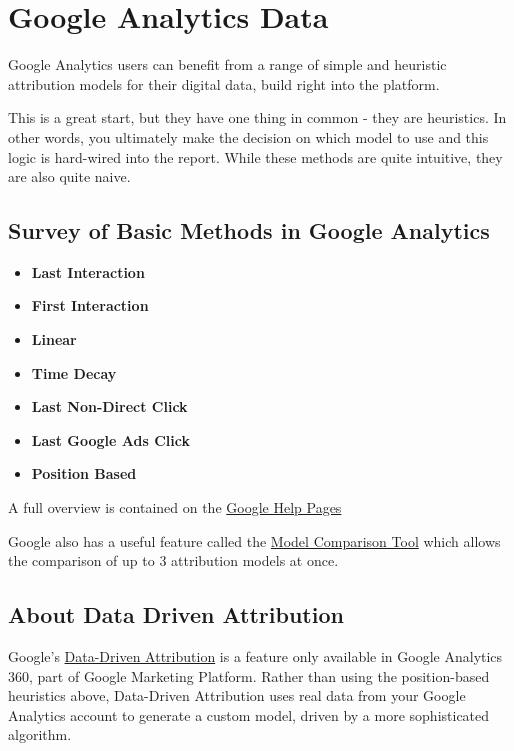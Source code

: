 \documentclass[]{book}
\providecommand{\tightlist}{%
  \setlength{\itemsep}{0pt}\setlength{\parskip}{0pt}}
\begin{document}
\chapter{Google Analytics Data}\label{google-analytics-data}

Google Analytics users can benefit from a range of simple and heuristic
attribution models for their digital data, build right into the
platform. \citep{noauthor_google_nodate}

This is a great start, but they have one thing in common - they are
heuristics. In other words, you ultimately make the decision on which
model to use and this logic is hard-wired into the report. While these
methods are quite intuitive, they are also quite naive.

\section{Survey of Basic Methods in Google
Analytics}\label{survey-of-basic-methods-in-google-analytics}

\begin{itemize}
\tightlist
\item
  \textbf{Last Interaction}
\item
  \textbf{First Interaction}
\item
  \textbf{Linear}
\item
  \textbf{Time Decay}
\item
  \textbf{Last Non-Direct Click}
\item
  \textbf{Last Google Ads Click}
\item
  \textbf{Position Based}
\end{itemize}

A full overview is contained on the
\href{https://support.google.com/analytics/answer/1665189?hl=en\&ref_topic=3205717}{Google
Help Pages}

Google also has a useful feature called the
\href{https://support.google.com/analytics/answer/6148697}{Model
Comparison Tool} which allows the comparison of up to 3 attribution
models at once.

\section{About Data Driven
Attribution}\label{about-data-driven-attribution}

Google's
\href{https://support.google.com/analytics/answer/3264076?\%20hl=en\&ref_topic=3180362}{Data-Driven
Attribution} is a feature only available in Google Analytics 360, part
of Google Marketing Platform. Rather than using the position-based
heuristics above, Data-Driven Attribution uses real data from your
Google Analytics account to generate a custom model, driven by a more
sophisticated algorithm.
\end{document}
